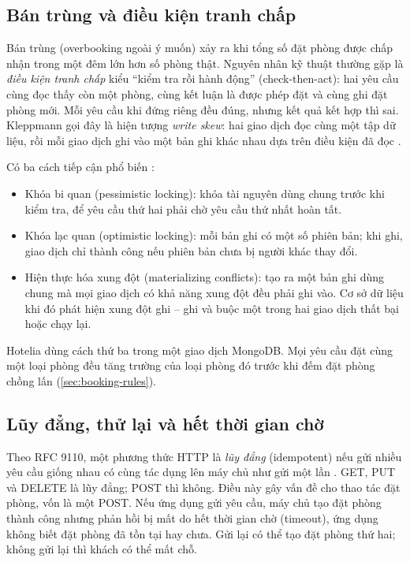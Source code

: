 \subsection{Bán trùng và điều kiện tranh chấp}

Bán trùng (overbooking ngoài ý muốn) xảy ra khi tổng số đặt phòng được chấp nhận trong một đêm lớn hơn số phòng thật. Nguyên nhân kỹ thuật thường gặp là \emph{điều kiện tranh chấp} kiểu ``kiểm tra rồi hành động'' (check-then-act): hai yêu cầu cùng đọc thấy còn một phòng, cùng kết luận là được phép đặt và cùng ghi đặt phòng mới. Mỗi yêu cầu khi đứng riêng đều đúng, nhưng kết quả kết hợp thì sai. Kleppmann gọi đây là hiện tượng \emph{write skew}: hai giao dịch đọc cùng một tập dữ liệu, rồi mỗi giao dịch ghi vào một bản ghi khác nhau dựa trên điều kiện đã đọc \cite{kleppmann2017}.

Có ba cách tiếp cận phổ biến \cite{kleppmann2017,fowler2002}:
\begin{itemize}
\item Khóa bi quan (pessimistic locking): khóa tài nguyên dùng chung trước khi kiểm tra, để yêu cầu thứ hai phải chờ yêu cầu thứ nhất hoàn tất.
\item Khóa lạc quan (optimistic locking): mỗi bản ghi có một số phiên bản; khi ghi, giao dịch chỉ thành công nếu phiên bản chưa bị người khác thay đổi.
\item Hiện thực hóa xung đột (materializing conflicts): tạo ra một bản ghi dùng chung mà mọi giao dịch có khả năng xung đột đều phải ghi vào. Cơ sở dữ liệu khi đó phát hiện xung đột ghi -- ghi và buộc một trong hai giao dịch thất bại hoặc chạy lại.
\end{itemize}
Hotelia dùng cách thứ ba trong một giao dịch MongoDB. Mọi yêu cầu đặt cùng một loại phòng đều tăng trường  của loại phòng đó trước khi đếm đặt phòng chồng lấn (\cref{sec:booking-rules}).

\subsection{Lũy đẳng, thử lại và hết thời gian chờ}\label{sec:idempotency-theory}

Theo RFC 9110, một phương thức HTTP là \emph{lũy đẳng} (idempotent) nếu gửi nhiều yêu cầu giống nhau có cùng tác dụng lên máy chủ như gửi một lần \cite{rfc9110}. GET, PUT và DELETE là lũy đẳng; POST thì không. Điều này gây vấn đề cho thao tác đặt phòng, vốn là một POST. Nếu ứng dụng gửi yêu cầu, máy chủ tạo đặt phòng thành công nhưng phản hồi bị mất do hết thời gian chờ (timeout), ứng dụng không biết đặt phòng đã tồn tại hay chưa. Gửi lại có thể tạo đặt phòng thứ hai; không gửi lại thì khách có thể mất chỗ.

